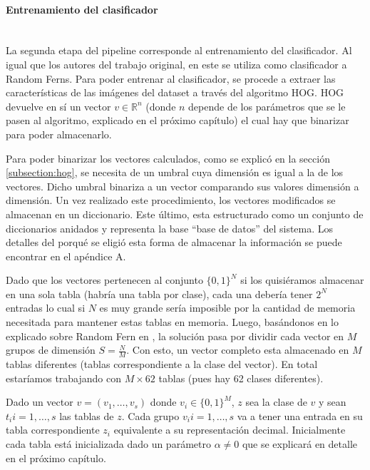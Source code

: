 		\paragraph{Entrenamiento del clasificador}  ~\\

			La segunda etapa del pipeline corresponde al entrenamiento del clasificador. Al igual que los autores del trabajo original, en este se utiliza como clasificador a Random Ferns. Para poder entrenar al clasificador, se procede a extraer las características de las imágenes del dataset a través del algoritmo HOG. HOG devuelve en sí un vector $v \in \mathbb{R}^{n}$ (donde $n$ depende de los parámetros que se le pasen al algoritmo, explicado en el próximo capítulo) el cual hay que binarizar para poder almacenarlo.

			Para poder binarizar los vectores calculados, como se explicó en la sección \ref{subsection:hog}, se necesita de un umbral cuya dimensión es igual a la de los vectores. Dicho umbral binariza a un vector comparando sus valores dimensión a dimensión. Un vez realizado este procedimiento, los vectores modificados se almacenan en un diccionario. Este último, esta estructurado como un conjunto de diccionarios anidados y representa la base ``base de datos'' del sistema. Los detalles del porqué se eligió esta forma de almacenar la información se puede encontrar en el apéndice A. 

			Dado que los vectores pertenecen al conjunto $\{ 0,1 \}^{N}$ si los quisiéramos almacenar en una sola tabla (habría una tabla por clase), cada una debería tener $2^{N}$ entradas lo cual si $N$ es muy grande sería imposible por la cantidad de memoria necesitada para mantener estas tablas en memoria. Luego, basándonos en lo explicado sobre Random Fern en \cite{subsection:ferns}, la solución pasa por dividir cada vector en $M$ grupos de dimensión $S = \frac{N}{M}$. Con esto, un vector completo esta almacenado en $M$ tablas diferentes (tablas correspondiente a la clase del vector). En total estaríamos trabajando con $M \times 62$ tablas (pues hay 62 clases diferentes).

			Dado un vector $v=(v_1, \dots, v_s)$ donde $v_i \in \{ 0,1 \}^{M}$, $z$ sea la clase de $v$ y sean $t_i i=1, \dots, s$ las tablas de $z$. Cada grupo $v_i i=1, \dots, s$ va a tener una entrada en su tabla correspondiente $z_i$ equivalente a su representación decimal. Inicialmente cada tabla está inicializada dado un parámetro $\alpha \neq 0$ que se explicará en detalle en el próximo capítulo.

